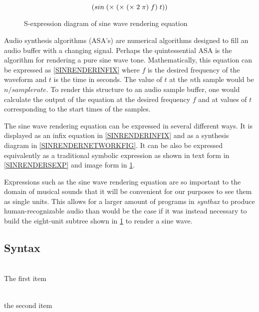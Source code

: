 \documentclass[12pt]{article}
\newcommand{\audiolanguagenamelower}{\emph{synthax}}
\begin{document}
\begin{equation}\label{SINRENDERSEXP}
\sexp{({sin} (\times (\times (\times 2 \pi) f) t))}
\end{equation}

\begin{figure}\label{SINRENDERSEXPFIG}
	\caption{S-expression diagram of sine wave rendering equation}
	\centering
\end{figure}

Audio synthesis algorithms (ASA's) are numerical algorithms designed to fill an audio buffer with a changing signal. Perhaps the quintessential ASA is the algorithm for rendering a pure sine wave tone. Mathematically, this equation can be expressed as \ref{SINRENDERINFIX} where $f$ is the desired frequency of the waveform and $t$ is the time in seconds. The value of $t$ at the $n$th sample would be $n/sample rate$. To render this structure to an audio sample buffer, one would calculate the output of the equation at the desired frequency $f$ and at values of $t$ corresponding to the start times of the samples.

The sine wave rendering equation can be expressed in several different ways. It is displayed as an infix equation in \ref{SINRENDERINFIX} and as a synthesis diagram in \ref{SINRENDERNETWORKFIG}. It can be also be expressed equivalently as a traditional symbolic expression as shown in text form in \ref{SINRENDERSEXP} and image form in \ref{SINRENDERSEXPFIG}.

Expressions such as the sine wave rendering equation are so important to the domain of musical sounds that it will be convenient for our purposes to see them as single units. This allows for a larger amount of programs in \audiolanguagenamelower{} to produce human-recognizable audio than would be the case if it was instead necessary to build the eight-unit subtree shown in \ref{SINRENDERSEXPFIG} to render a sine wave.

\subsection{Syntax}\label{SYNTAX}
\begin{description}\label{CURRENTPRIMITIVES}
	\item[first] \hfill \\
		The first item
	\item[second] \hfill \\
		the second item
\end{description}
\end{document}
